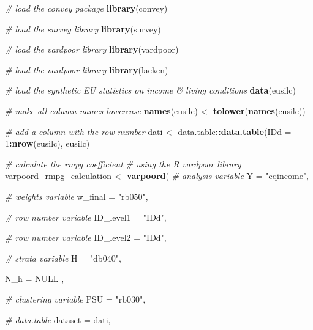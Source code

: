 \documentclass[
]{book}
\newenvironment{Shaded}{\begin{snugshade}}{\end{snugshade}}
\newcommand{\AttributeTok}[1]{\textcolor[rgb]{0.13,0.29,0.53}{#1}}
\newcommand{\CommentTok}[1]{\textcolor[rgb]{0.56,0.35,0.01}{\textit{#1}}}
\newcommand{\ConstantTok}[1]{\textcolor[rgb]{0.56,0.35,0.01}{#1}}
\newcommand{\DecValTok}[1]{\textcolor[rgb]{0.00,0.00,0.81}{#1}}
\newcommand{\FunctionTok}[1]{\textcolor[rgb]{0.13,0.29,0.53}{\textbf{#1}}}
\newcommand{\NormalTok}[1]{#1}
\newcommand{\OtherTok}[1]{\textcolor[rgb]{0.56,0.35,0.01}{#1}}
\newcommand{\SpecialCharTok}[1]{\textcolor[rgb]{0.81,0.36,0.00}{\textbf{#1}}}
\newcommand{\StringTok}[1]{\textcolor[rgb]{0.31,0.60,0.02}{#1}}
\begin{document}
\begin{Shaded}
\begin{Highlighting}[]
\CommentTok{\# load the convey package}
\FunctionTok{library}\NormalTok{(convey)}

\CommentTok{\# load the survey library}
\FunctionTok{library}\NormalTok{(survey)}

\CommentTok{\# load the vardpoor library}
\FunctionTok{library}\NormalTok{(vardpoor)}

\CommentTok{\# load the vardpoor library}
\FunctionTok{library}\NormalTok{(laeken)}

\CommentTok{\# load the synthetic EU statistics on income \& living conditions}
\FunctionTok{data}\NormalTok{(eusilc)}

\CommentTok{\# make all column names lowercase}
\FunctionTok{names}\NormalTok{(eusilc) }\OtherTok{\textless{}{-}} \FunctionTok{tolower}\NormalTok{(}\FunctionTok{names}\NormalTok{(eusilc))}

\CommentTok{\# add a column with the row number}
\NormalTok{dati }\OtherTok{\textless{}{-}}\NormalTok{ data.table}\SpecialCharTok{::}\FunctionTok{data.table}\NormalTok{(}\AttributeTok{IDd =} \DecValTok{1}\SpecialCharTok{:}\FunctionTok{nrow}\NormalTok{(eusilc), eusilc)}

\CommentTok{\# calculate the rmpg coefficient}
\CommentTok{\# using the R vardpoor library}
\NormalTok{varpoord\_rmpg\_calculation }\OtherTok{\textless{}{-}}
  \FunctionTok{varpoord}\NormalTok{(}
    \CommentTok{\# analysis variable}
    \AttributeTok{Y =} \StringTok{"eqincome"}\NormalTok{,}
    
    \CommentTok{\# weights variable}
    \AttributeTok{w\_final =} \StringTok{"rb050"}\NormalTok{,}
    
    \CommentTok{\# row number variable}
    \AttributeTok{ID\_level1 =} \StringTok{"IDd"}\NormalTok{,}
    
    \CommentTok{\# row number variable}
    \AttributeTok{ID\_level2 =} \StringTok{"IDd"}\NormalTok{,}
    
    \CommentTok{\# strata variable}
    \AttributeTok{H =} \StringTok{"db040"}\NormalTok{,}
    
    \AttributeTok{N\_h =} \ConstantTok{NULL}\NormalTok{ ,}
    
    \CommentTok{\# clustering variable}
    \AttributeTok{PSU =} \StringTok{"rb030"}\NormalTok{,}
    
    \CommentTok{\# data.table}
    \AttributeTok{dataset =}\NormalTok{ dati,}
    

\end{Highlighting}
\end{Shaded}
\end{document}
